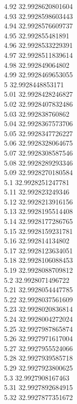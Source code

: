 {4.92	32.9928620801604\\
4.93	32.9928598603443\\
4.94	32.9928576609737\\
4.95	32.992855481891\\
4.96	32.9928533229391\\
4.97	32.9928511839614\\
4.98	32.992849064802\\
4.99	32.9928469653055\\
5	32.9928448853171\\
5.01	32.9928428246827\\
5.02	32.9928407832486\\
5.03	32.992838760862\\
5.04	32.9928367573706\\
5.05	32.9928347726227\\
5.06	32.9928328064675\\
5.07	32.9928308587546\\
5.08	32.9928289293346\\
5.09	32.9928270180584\\
5.1	32.9928251247781\\
5.11	32.992823249346\\
5.12	32.9928213916156\\
5.13	32.9928195514408\\
5.14	32.9928177286765\\
5.15	32.9928159231781\\
5.16	32.992814134802\\
5.17	32.9928123634051\\
5.18	32.9928106088453\\
5.19	32.9928088709812\\
5.2	32.9928071496722\\
5.21	32.9928054447785\\
5.22	32.9928037561609\\
5.23	32.9928020836814\\
5.24	32.9928004272024\\
5.25	32.9927987865874\\
5.26	32.9927971617004\\
5.27	32.9927955524066\\
5.28	32.9927939585718\\
5.29	32.9927923800625\\
5.3	32.9927908167463\\
5.31	32.9927892684915\\
5.32	32.9927877351672\\
}
